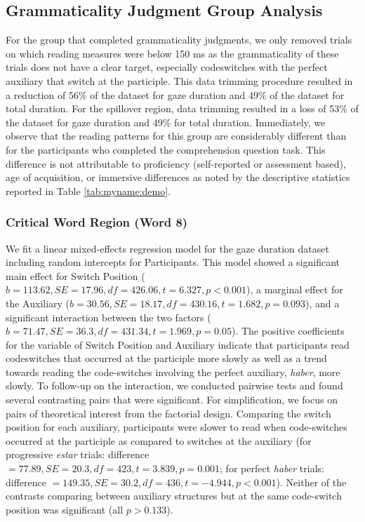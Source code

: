 \documentclass[output=paper,colorlinks,citecolor=brown]{langscibook}
\begin{document}
\subsection{Grammaticality Judgment Group Analysis}
For the group that completed grammaticality judgments, we only removed trials on which reading measures were below 150 ms as the grammaticality of these trials does not have a clear target, especially codeswitches with the perfect auxiliary that switch at the participle. This data trimming procedure resulted in a reduction of 56\% of the dataset for gaze duration and 49\% of the dataset for total duration. For the spillover region, data trimming resulted in a loss of 53\% of the dataset for gaze duration and 49\% for total duration. Immediately, we observe that the reading patterns for this group are considerably different than for the participants who completed the comprehension question task. This difference is not attributable to proficiency (self-reported or assessment based), age of acquisition, or immersive differences as noted by the descriptive statistics reported in Table \ref{tab:myname:demo}.

\subsubsection{Critical Word Region (Word 8)}
We fit a linear mixed-effects regression model for the gaze duration dataset including random intercepts for Participants. This model showed a significant main effect for Switch Position ($b = 113.62, SE = 17.96, df = 426.06, t = 6.327, p < 0.001$), a marginal effect for the Auxiliary ($b = 30.56, SE = 18.17, df = 430.16, t = 1.682, p = 0.093$), and a significant interaction between the two factors ($b = 71.47, SE = 36.3, df = 431.34, t = 1.969, p = 0.05$). The positive coefficients for the variable of Switch Position and Auxiliary indicate that participants read codeswitches that occurred at the participle more slowly as well as a trend towards reading the code-switches involving the perfect auxiliary, \textit{haber}, more slowly. To follow-up on the interaction, we conducted pairwise tests and found several contrasting pairs that were significant. For simplification, we focus on pairs of theoretical interest from the factorial design. Comparing the switch position for each auxiliary, participants were slower to read when code-switches occurred at the participle as compared to switches at the auxiliary (for progressive \textit{estar} trials: difference $= 77.89, SE = 20.3, df = 423, t = 3.839, p = 0.001$; for perfect \textit{haber} trials: difference $= 149.35, SE = 30.2, df = 436, t = -4.944, p < 0.001$). Neither of the contrasts comparing between auxiliary structures but at the same code-switch position was significant (all $p > 0.133$).
\end{document}
